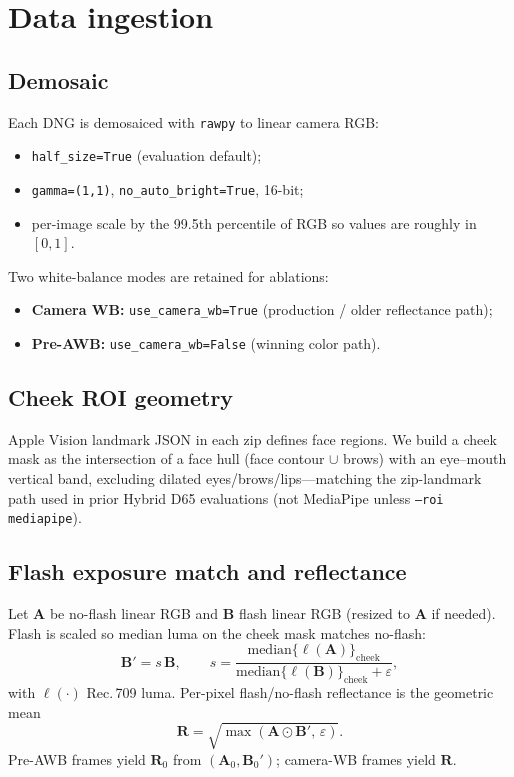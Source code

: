 \documentclass[11pt]{article}
\newcommand{\Rvec}{\mathbf{R}}
\begin{document}
\section{Data ingestion}

\subsection{Demosaic}
Each DNG is demosaiced with \texttt{rawpy} to linear camera RGB:
\begin{itemize}[noitemsep]
  \item \texttt{half\_size=True} (evaluation default);
  \item \texttt{gamma=(1,1)}, \texttt{no\_auto\_bright=True}, 16-bit;
  \item per-image scale by the 99.5th percentile of RGB so values are roughly in $[0,1]$.
\end{itemize}
Two white-balance modes are retained for ablations:
\begin{itemize}[noitemsep]
  \item \textbf{Camera WB:} \texttt{use\_camera\_wb=True} (production / older reflectance path);
  \item \textbf{Pre-AWB:} \texttt{use\_camera\_wb=False} (winning color path).
\end{itemize}

\subsection{Cheek ROI geometry}
Apple Vision landmark JSON in each zip defines face regions.
We build a cheek mask as the intersection of a face hull (face contour $\cup$ brows) with an eye--mouth vertical band, excluding dilated eyes/brows/lips---matching the zip-landmark path used in prior Hybrid D65 evaluations (not MediaPipe unless \texttt{--roi mediapipe}).

\subsection{Flash exposure match and reflectance}
Let $\mathbf{A}$ be no-flash linear RGB and $\mathbf{B}$ flash linear RGB (resized to $\mathbf{A}$ if needed).
Flash is scaled so median luma on the cheek mask matches no-flash:
\begin{equation}
  \mathbf{B}' = s\,\mathbf{B},\qquad
  s = \frac{\mathrm{median}\{\ell(\mathbf{A})\}_{\mathrm{cheek}}}
           {\mathrm{median}\{\ell(\mathbf{B})\}_{\mathrm{cheek}}+\varepsilon},
\end{equation}
with $\ell(\cdot)$ Rec.\,709 luma.
Per-pixel flash/no-flash reflectance is the geometric mean
\begin{equation}
  \Rvec = \sqrt{\max(\mathbf{A}\odot\mathbf{B}',\,\varepsilon)}.
\end{equation}
Pre-AWB frames yield $\Rvec_0$ from $(\mathbf{A}_0,\mathbf{B}_0')$; camera-WB frames yield $\Rvec$.
\end{document}
